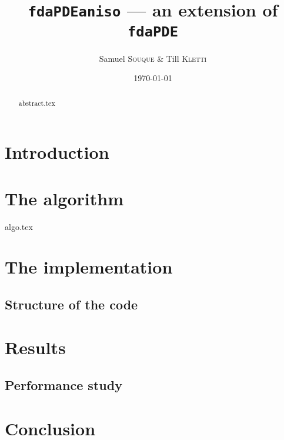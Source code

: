 \documentclass[10pt,language=english]{article}
\title{\texttt{fdaPDEaniso} --- an extension of \texttt{fdaPDE}}
\author{Samuel \textsc{Souque} \& Till \textsc{Kletti}}
\date{\today}
\begin{document}
\maketitle

\begin{abstract}
	{abstract.tex}
\end{abstract}

\tableofcontents

\section*{Introduction}

\section{The algorithm}
	{algo.tex}

\section{The implementation}
	\subsection{Structure of the code}

\section{Results}
	\subsection{Performance study}

\section*{Conclusion}

\printbibliography
\end{document}

